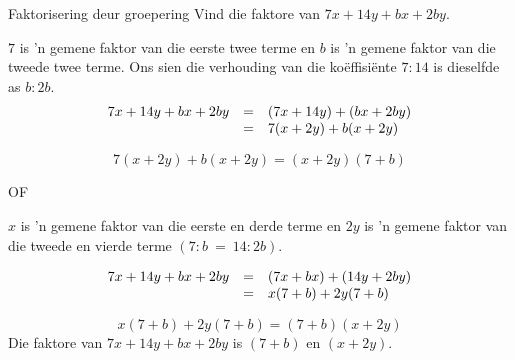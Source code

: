 \begin{wex}{Faktorisering deur groepering }{Vind die faktore van $7x+14y+bx+2by$.}
{


 $7$ is ’n gemene faktor van die eerste twee terme en $b$ is ’n gemene faktor van die tweede twee terme. Ons sien die verhouding van die ko\"effisi\"ente $7:14$ is dieselfde as $b:2b$.
\begin{equation*}
 \begin{array}{ccl}

7x+14y+bx+2by&=& (7x+14y)+(bx+2by)  \hfill\\ 
&=&7(x+2y)+b(x+2y) \hfill 
\end{array}
\end{equation*}


\begin{equation*}
7(x+2y)+b(x+2y)=(x+2y)(7+b)
\end{equation*}
% 
\par 
\large{OF}
% 
% 
% 

\setcounter{stepcounter}{1}
$x$ is 'n gemene faktor van die eerste en derde terme en $2y$ is 'n gemene faktor van die tweede en vierde terme $(7:b~=~14:2b)$.\par 
{}

\begin{equation*}
 \begin{array}{ccl}

7x+14y+bx+2by&=& (7x+bx)+(14y+2by)  \hfill\\ 
&=&x(7+b)+2y(7+b) \hfill 
\end{array}
\end{equation*}


\begin{equation*}
x(7+b)+2y(7+b) = (7+b)(x+2y)
\end{equation*}
Die faktore van $7x+14y+bx+2by$ is $(7+b)$ en $(x+2y)$.
}
\end{wex}


